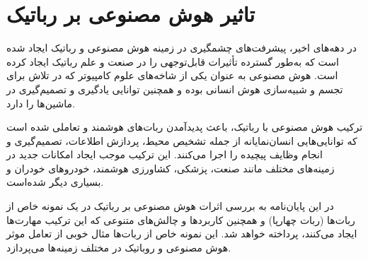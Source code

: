 \section{تاثیر هوش مصنوعی بر رباتیک}

در دهه‌های اخیر، پیشرفت‌های چشمگیری در زمینه هوش مصنوعی و رباتیک ایجاد شده است که به‌طور گسترده تأثیرات قابل‌توجهی را در صنعت و علم رباتیک ایجاد کرده است. هوش مصنوعی به عنوان یکی از شاخه‌های علوم کامپیوتر که در تلاش برای تجسم و شبیه‌سازی هوش انسانی بوده و همچنین توانایی یادگیری و تصمیم‌گیری در ماشین‌ها را دارد.

ترکیب هوش مصنوعی با رباتیک، باعث پدیدآمدن ربات‌های هوشمند و تعاملی شده است که توانایی‌هایی انسان‌نمایانه از جمله تشخیص محیط، پردازش اطلاعات، تصمیم‌گیری و انجام وظایف پیچیده را اجرا می‌کنند. این ترکیب موجب ایجاد امکانات جدید در زمینه‌های مختلف مانند صنعت، پزشکی، کشاورزی هوشمند، خودروهای خودران و بسیاری دیگر شده‌است.

در این پایان‌نامه به بررسی اثرات هوش مصنوعی بر رباتیک در یک نمونه خاص از ربات‌ها (ربات چهارپا) و همچنین کاربردها و چالش‌های متنوعی که این ترکیب مهارت‌ها ایجاد می‌کنند، پرداخته خواهد شد. این نمونه خاص‌ از ربات‌ها مثال خوبی از تعامل موثر هوش مصنوعی و روباتیک در مختلف زمینه‌ها می‌پردازد.

